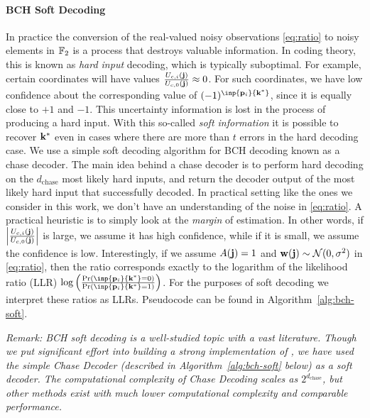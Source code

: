 \paragraph{BCH Soft Decoding} In practice the conversion of the real-valued noisy observations \eqref{eq:ratio} to noisy elements in $\mathbb F_2$ is a process that destroys valuable information. In coding theory, this is known as \emph{hard input} decoding, which is typically suboptimal. For example, certain coordinates will have values $\frac{U_{c,i}(\mathbf j)}{U_{c,0}(\mathbf j)} \approx 0$. For such coordinates, we have low confidence about the corresponding value of $(-1)^{\inp{\bp_i}{\bk^*}}$, since it is equally close to $+1$ and $-1$. This uncertainty information is lost in the process of producing a hard input. With this so-called \emph{soft information} it is possible to recover $\mathbf k^*$ even in cases where there are more than $t$ errors in the hard decoding case. We use a simple soft decoding algorithm for BCH decoding known as a chase decoder. The main idea behind a chase decoder   is to perform hard decoding on the $d_{\text{chase}}$ most likely hard inputs, and return the decoder output of the most likely hard input that successfully decoded. In practical setting like the ones we consider in this work, we don't have an understanding of the noise in \eqref{eq:ratio}. A practical heuristic is to simply look at the \emph{margin} of estimation. In other words, if $\left\lvert \frac{U_{c,i}(\mathbf j)}{U_{c,0}(\mathbf j)} \right\rvert$ is large, we assume it has high confidence, while if it is small, we assume the confidence is low. Interestingly, if we assume $A(\mathbf j) = 1$ and $\mathbf w(\mathbf j) \sim \mathcal N(0, \sigma^2)$ in \eqref{eq:ratio}, then the ratio corresponds exactly to the logarithm of the likelihood ratio (LLR) $\log \left( \frac{\mathrm{Pr}\left(\inp{\bp_i}{\bk^*} = 0\right)}{\mathrm{Pr}\left(\inp{\bp_i}{\bk^*} = 1\right)}\right)$. For the purposes of soft decoding we interpret these ratios as LLRs. Pseudocode can be found in Algorithm~\ref{alg:bch-soft}.


\emph{Remark: BCH soft decoding is a well-studied topic with a vast literature. Though we put significant effort into building a strong implementation of \SpecExp{}, we have used the simple Chase Decoder (described in Algorithm~\ref{alg:bch-soft} below) as a soft decoder. The computational complexity of Chase Decoding scales as $2^{d_\text{chase}}$, but other methods exist with much lower computational complexity and comparable performance.}

